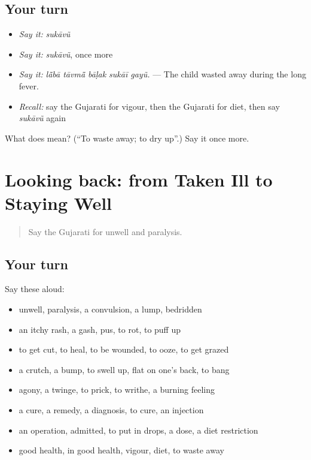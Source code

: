 \subsection*{Your turn}
\begin{itemize}
\raggedright
  \item \emph{Say it:} \emph{sukāvũ}
  \item \emph{Say it:} \emph{sukāvũ}, once more
  \item \emph{Say it:} \emph{lā̃bā tāvmā̃ bāḷak sukāī gayũ.} — The child wasted away during the long fever.
  \item \emph{Recall:} say the Gujarati for vigour, then the Gujarati for diet, then say \emph{sukāvũ} again
\end{itemize}

\begin{tcolorbox}[breakable,colback=teal!4,colframe=teal!35!black,title={Before you move on}]
What does  mean? (\textquotedblleft{}To waste away; to dry up\textquotedblright{}.) Say it once more.
\end{tcolorbox}
\section[(dialogue)]{Looking back: from Taken Ill to Staying Well}

\label{lesson:GU-R486-review-479-486}



\begin{quote}
Say the Gujarati for unwell and paralysis.
\end{quote}

\subsection*{Your turn}
Say these aloud:

\begin{itemize}
\raggedright
  \item unwell, paralysis, a convulsion, a lump, bedridden
  \item an itchy rash, a gash, pus, to rot, to puff up
  \item to get cut, to heal, to be wounded, to ooze, to get grazed
  \item a crutch, a bump, to swell up, flat on one's back, to bang
  \item agony, a twinge, to prick, to writhe, a burning feeling
  \item a cure, a remedy, a diagnosis, to cure, an injection
  \item an operation, admitted, to put in drops, a dose, a diet restriction
  \item good health, in good health, vigour, diet, to waste away
\end{itemize}

